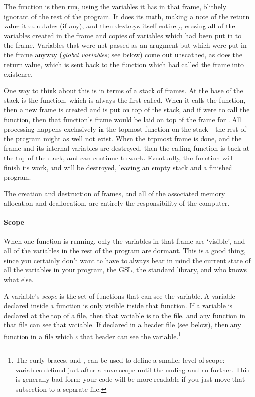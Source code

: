 \documentclass[12pt]{article}
\begin{document}
The function is then run, using the variables it has in that frame,
blithely ignorant of the rest of the program. It does its math, making a
note of the return value it calculates (if any), and then destroys itself
entirely, erasing all of the variables created in the frame and copies
of variables which had been put in to the frame. Variables that were not
passed as an arugment but which were put in the frame anyway ({\sl global
variables}; see below) come out unscathed, as does the return value, which
is sent back to the function which had called the frame into existence.

One way to think about this is in terms of a stack of frames. At the
base of the stack is the  function, which is always the first
called. When it calls the  function, then a new frame
is created and is put on top of the stack, and if 
were to call the  function, then that function's frame would be laid on top
of the frame for . All processing happens exclusively in
the topmost function on the stack---the rest of the program might as
well not exist. When the topmost frame is done, and the frame and its
internal variables are destroyed, then the calling function is back at
the top of the stack, and can continue to work. Eventually, the  function will finish its work, and will be destroyed, leaving an
empty stack and a finished program.

The creation and destruction of frames, and all of the associated
memory allocation and deallocation, are entirely the responsibility of
the computer.   

\paragraph{Scope}	\label{scope}

When one function is running, only the variables in that frame are
`visible', and all of the variables in the rest of the program are 
dormant.  This is a good thing, since you certainly don't want to have
to always bear in mind the current state of  all the variables in your program,
the GSL, the standard library, and who knows what else.

A variable's {\sl scope} is the set of functions that can see the
variable. A variable declared inside a function is only visible inside
that function.  If a variable is declared at the top of a file, then
that variable is  to the file, and any function in that
file can see that variable. If declared in a header file (see below),
then any function in a file which s that header  can see
the variable.\footnote{The curly braces, \cinline{\{} and \cinline{\}}, can be
used to define a smaller level of scope: variables defined just after a
\cinline{\{} have scope until the ending \cinline{\}} and no further. This is
generally bad form: your code will be more readable if you just move
that subsection to a separate file.}
\end{document}
